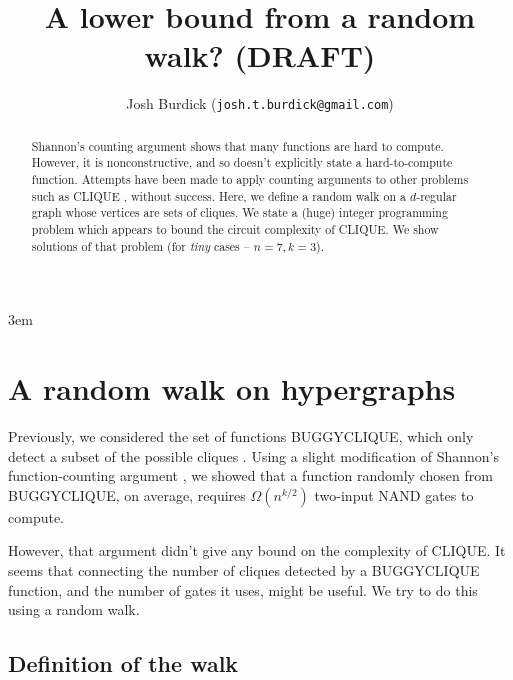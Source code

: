 \documentclass[12pt]{article}
\theoremstyle{definition}
\begin{document}
\emergencystretch 3em
\title{A lower bound from a random walk? (DRAFT)}

\author{Josh Burdick ({\tt josh.t.burdick@gmail.com})}

\maketitle

\begin{abstract}

Shannon's counting argument \cite{shannon_synthesis_1949} shows that many functions are hard to compute.
However, it is nonconstructive, and so doesn't explicitly state a
hard-to-compute function. Attempts have been made to apply counting arguments to other problems
such as CLIQUE \cite{buggyclique}, without success.
Here, we define a random walk on a $d$-regular graph whose vertices are
sets of cliques. We state a (huge) integer programming
problem which appears to bound the circuit complexity of CLIQUE. We show solutions
of that problem (for {\em tiny} cases -- $n=7, k=3$).

\end{abstract}

\newpage

\tableofcontents

\vspace{5mm}


\section{A random walk on hypergraphs} \label{se:countingBound}

Previously, we considered the set of functions BUGGYCLIQUE, which
only detect a subset of the possible cliques \cite{buggyclique}.
Using a slight modification of Shannon's
function-counting argument \cite{shannon_synthesis_1949},
we showed that a function randomly chosen from BUGGYCLIQUE,
on average, requires $\Omega(n^{k/2})$ two-input NAND gates to compute.

However, that argument didn't give any bound on the complexity of CLIQUE.
It seems that connecting the number of cliques detected by a BUGGYCLIQUE
function, and the number of gates it uses, might be useful. We try
to do this using a random walk.

\subsection{Definition of the walk}
\end{document}
